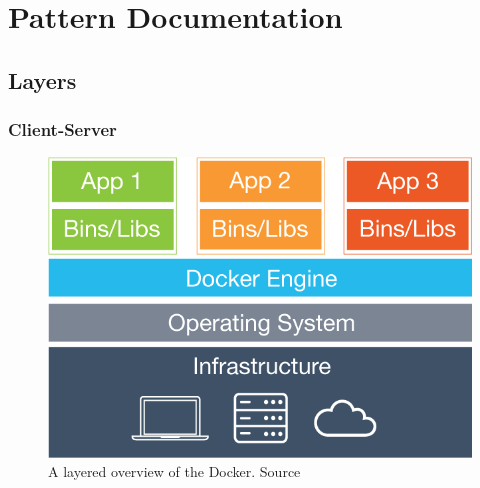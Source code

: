 
\clearpage
\chapter{Pattern Documentation}
\label{ch:patterns}


\section{Layers}


\subsection{Client-Server}


\begin{figure}[H]
\centering
\includegraphics[scale=0.4]{5-patterns/images/what-is-vm-diagram.png}
\caption{A layered overview of the Docker. Source \cite{whatisdocker}}
\label{fig:layers-pattern}
\end{figure}

